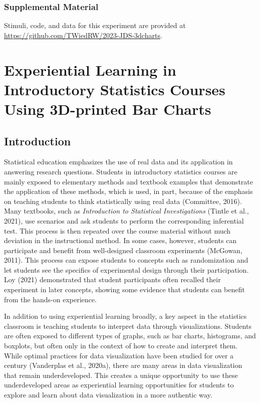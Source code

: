 \documentclass[phd]{nuthesis}
\begin{document}
\subsection{Supplemental Material}\label{supplemental-material}

Stimuli, code, and data for this experiment are provided at
\url{https://github.com/TWiedRW/2023-JDS-3dcharts}.


\chapter{Experiential Learning in Introductory Statistics Courses Using
3D-printed Bar
Charts}\label{experiential-learning-in-introductory-statistics-courses-using-3d-printed-bar-charts}

\section{Introduction}\label{introduction-1}

Statistical education emphasizes the use of real data and its
application in answering research questions. Students in introductory
statistics courses are mainly exposed to elementary methods and textbook
examples that demonstrate the application of these methods, which is
used, in part, because of the emphasis on teaching students to think
statistically using real data (Committee, 2016). Many textbooks, such as
\emph{Introduction to Statistical Investigations} (Tintle et al., 2021),
use scenarios and ask students to perform the corresponding inferential
test. This process is then repeated over the course material without
much deviation in the instructional method. In some cases, however,
students can participate and benefit from well-designed classroom
experiments (McGowan, 2011). This process can expose students to
concepts such as randomization and let students see the specifics of
experimental design through their participation. Loy (2021) demonstrated
that student participants often recalled their experiment in later
concepts, showing some evidence that students can benefit from the
hands-on experience.

In addition to using experiential learning broadly, a key aspect in the
statistics classroom is teaching students to interpret data through
visualizations. Students are often exposed to different types of graphs,
such as bar charts, histograms, and boxplots, but often only in the
context of how to create and interpret them. While optimal practices for
data visualization have been studied for over a century (Vanderplas et
al., 2020a), there are many areas in data visualization that remain
underdeveloped. This creates a unique opportunity to use these
underdeveloped areas as experiential learning opportunities for students
to explore and learn about data visualization in a more authentic way.
\end{document}
